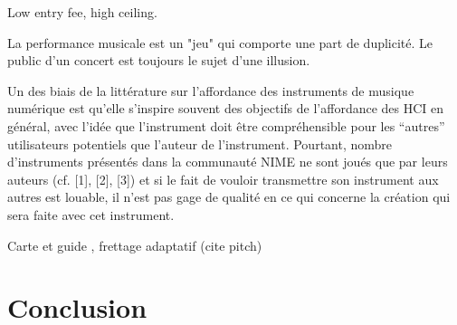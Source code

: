 Low entry fee, high ceiling.

La performance musicale est un "jeu" qui comporte une part de duplicité. Le public d'un concert est toujours le sujet d'une illusion. 

Un des biais de la littérature sur l’affordance des instruments de musique numérique est qu’elle s’inspire souvent des objectifs de l’affordance des HCI en général, avec l’idée que l’instrument doit être compréhensible pour les “autres” utilisateurs potentiels que l’auteur de l’instrument. Pourtant, nombre d’instruments présentés dans la communauté NIME ne sont joués que par leurs auteurs (cf. [1], [2], [3]) et si le fait de vouloir transmettre son instrument aux autres est louable, il n’est pas gage de qualité en ce qui concerne la création qui sera faite avec cet instrument.     

\cite{bin_show_2018}

Carte et guide , frettage adaptatif (cite pitch)



\section{Conclusion}
\label{sec:transparency:conclusion}
